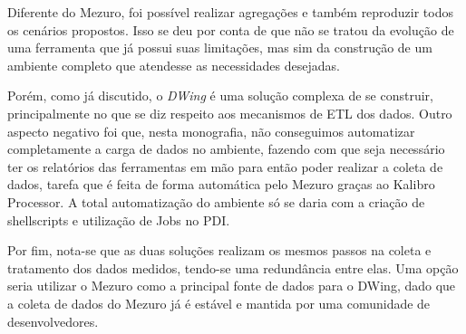 Diferente do Mezuro, foi possível realizar agregações e também reproduzir todos os cenários propostos. Isso se deu por conta de que não se tratou da evolução de uma ferramenta que já possui suas limitações, mas sim da construção de um ambiente completo que atendesse as necessidades desejadas.

Porém, como já discutido, o \emph{DWing} é uma solução complexa de se construir, principalmente no que se diz respeito aos  mecanismos de ETL dos dados. Outro aspecto negativo foi que, nesta monografia, não conseguimos automatizar completamente a carga de dados no ambiente, fazendo com que seja necessário ter os relatórios das ferramentas em mão para então poder realizar a coleta de dados, tarefa que é feita de forma automática pelo Mezuro graças ao Kalibro Processor. A total automatização do ambiente só se daria com a criação de shellscripts e utilização de Jobs no PDI.


Por fim, nota-se que as duas soluções realizam os mesmos passos na coleta e tratamento dos dados medidos, tendo-se uma redundância entre elas. Uma opção seria utilizar o Mezuro como a principal fonte de dados para o DWing, dado que a coleta de dados do Mezuro já é estável e mantida por uma comunidade de desenvolvedores.